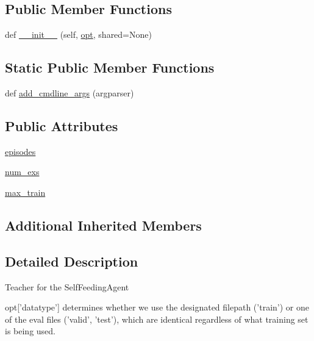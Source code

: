 \subsection*{Public Member Functions}
\begin{DoxyCompactItemize}
\item 
def \hyperlink{classparlai_1_1tasks_1_1self__feeding_1_1agents_1_1SelfFeedingTeacher_ab0ab36e04c55553c03a77c049ae72a43}{\+\_\+\+\_\+init\+\_\+\+\_\+} (self, \hyperlink{classparlai_1_1core_1_1agents_1_1Teacher_a3ce6243860ce978a897922863ed32fa4}{opt}, shared=None)
\end{DoxyCompactItemize}
\subsection*{Static Public Member Functions}
\begin{DoxyCompactItemize}
\item 
def \hyperlink{classparlai_1_1tasks_1_1self__feeding_1_1agents_1_1SelfFeedingTeacher_a07b3ffdd16baf2b93be5e87e11f6745c}{add\+\_\+cmdline\+\_\+args} (argparser)
\end{DoxyCompactItemize}
\subsection*{Public Attributes}
\begin{DoxyCompactItemize}
\item 
\hyperlink{classparlai_1_1tasks_1_1self__feeding_1_1agents_1_1SelfFeedingTeacher_a63dea9aaa22e209cc87ef89a58e1b47f}{episodes}
\item 
\hyperlink{classparlai_1_1tasks_1_1self__feeding_1_1agents_1_1SelfFeedingTeacher_a6f2bcfa23af24a60b672b9ec368c09ff}{num\+\_\+exs}
\item 
\hyperlink{classparlai_1_1tasks_1_1self__feeding_1_1agents_1_1SelfFeedingTeacher_ad3868ed012b1209fa330702147ed85b9}{max\+\_\+train}
\end{DoxyCompactItemize}
\subsection*{Additional Inherited Members}


\subsection{Detailed Description}
\begin{DoxyVerb}Teacher for the SelfFeedingAgent

opt['datatype'] determines whether we use the designated filepath ('train') or
    one of the eval files ('valid', 'test'), which are identical regardless of
    what training set is being used.
\end{DoxyVerb}
 

